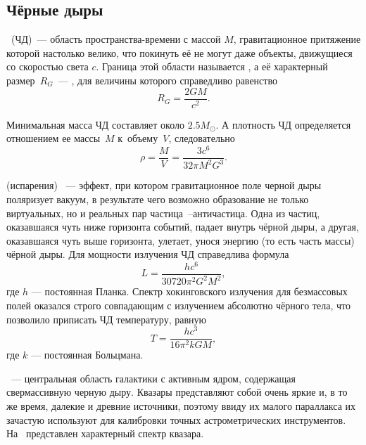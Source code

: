 \subsection{Чёрные дыры}
~(ЧД)~--- область пространства-времени с массой $M$, гравитационное притяжение которой настолько велико, что покинуть её не могут даже объекты, движущиеся со скоростью света $c$. Граница этой области называется , а её характерный размер~$R_G$~--- , для величины которого справедливо равенство
\begin{equation}
    R_G = \frac{2 G M}{c^2}.
\end{equation}

Минимальная масса ЧД составляет около $2.5M_{\odot}$. А плотность ЧД определяется отношением ее массы~$M$ к~объему~$V$, следовательно
\begin{equation}
    \rho = \frac{M}{V} = \frac{3c^6}{32\pi M^2G^3}.
\end{equation}

 (испарения) ~--- эффект, при котором гравитационное поле черной дыры поляризует вакуум, в результате чего возможно образование не только виртуальных, но и реальных пар частица~--античастица. Одна из частиц, оказавшаяся чуть ниже горизонта событий, падает внутрь чёрной дыры, а другая, оказавшаяся чуть выше горизонта, улетает, унося энергию (то есть часть массы) чёрной дыры. Для мощности излучения ЧД справедлива формула
\begin{equation}
    L = \frac{h c^6}{30720 \pi^2 G^2 M^2},
\end{equation}
где $h$ --- постоянная Планка. Спектр хокинговского излучения для безмассовых полей оказался строго совпадающим с излучением абсолютно чёрного тела, что позволило приписать ЧД температуру, равную
\begin{equation}
    T = \frac{h c^3}{16 \pi^2 k G M},
\end{equation}
где $k$ --- постоянная Больцмана.

~— центральная область галактики с активным ядром, содержащая свермассивную черную дыру. Квазары представляют собой очень яркие и, в то же время, далекие и древние источники, поэтому ввиду их малого параллакса их зачастую используют для калибровки точных астрометрических инструментов. На~ представлен характерный спектр квазара.

